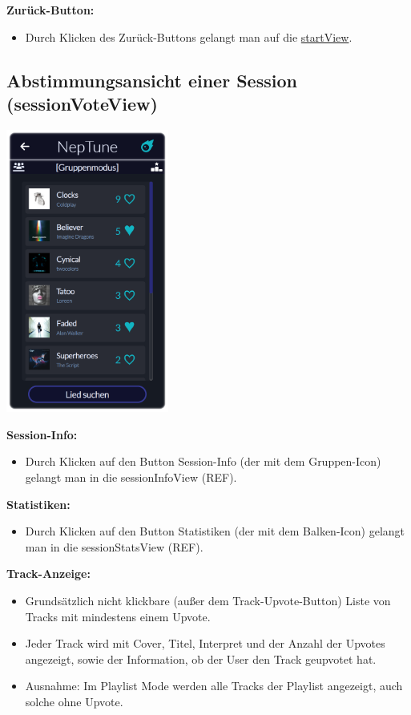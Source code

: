\documentclass[oneside, ngerman]{sdqtechreport}
\begin{document}
\textbf{Zurück-Button:}
\begin{itemize}
    \item Durch Klicken des Zurück-Buttons gelangt man auf die \hyperlink{startView}{startView}.
\end{itemize}

\subsection{Abstimmungsansicht einer Session (sessionVoteView)}
\label{sec:Benutzeroberfläche:sessionVoteView}


\begin{center}
    \hypertarget{sessionVoteView}{}
    \includegraphics[width=0.4\textwidth]{LATEX/Pflichtenheft/GraphicDesigns/userVotePage.png}
\end{center}

\textbf{Session-Info:}
\begin{itemize}
    \item Durch Klicken auf den Button Session-Info (der mit dem Gruppen-Icon) gelangt man in die sessionInfoView (REF).
\end{itemize}

\textbf{Statistiken:}
\begin{itemize}
    \item Durch Klicken auf den Button Statistiken (der mit dem Balken-Icon) gelangt man in die sessionStatsView (REF).
\end{itemize}

\textbf{Track-Anzeige:}
\begin{itemize}
    \item Grundsätzlich nicht klickbare (außer dem Track-Upvote-Button) Liste von Tracks mit mindestens einem Upvote. \item Jeder Track wird mit Cover, Titel, Interpret und der Anzahl der Upvotes angezeigt, sowie der Information, ob der User den Track geupvotet hat.
    \item Ausnahme: Im Playlist Mode werden alle Tracks der Playlist angezeigt, auch solche ohne Upvote.
\end{itemize}
\end{document}
